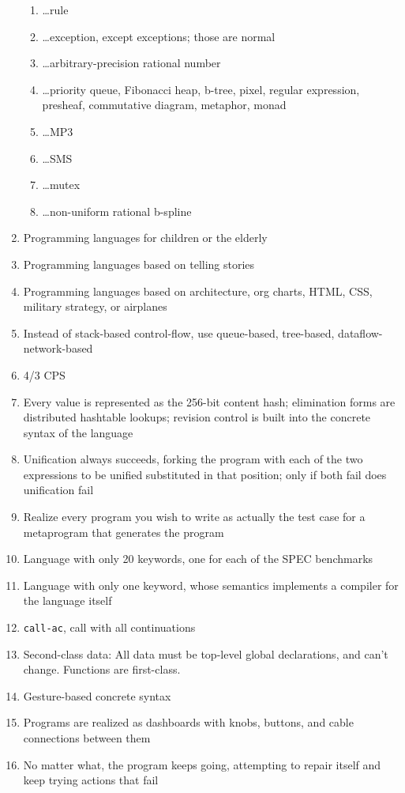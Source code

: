 \documentclass[acmtocl]%
{boviktrans}
\begin{document}
\begin{enumerate}
\begin{enumerate}
     \item \ldots rule
     \item \ldots exception, except exceptions; those are normal
     \item \ldots arbitrary-precision rational number
     \item \ldots priority queue, Fibonacci heap, b-tree, pixel, regular expression, presheaf, commutative diagram, metaphor, monad
     \item \ldots MP3
     \item \ldots SMS
     \item \ldots mutex
     \item \ldots non-uniform rational b-spline
   \end{enumerate}
\item Programming languages for children or the elderly
\item Programming languages based on telling stories
\item Programming languages based on architecture, org charts, HTML, CSS, military strategy, or airplanes
\item Instead of stack-based control-flow, use queue-based, tree-based, dataflow-network-based
\item 4/3 CPS
\item Every value is represented as the 256-bit content hash; elimination forms are distributed hashtable lookups; revision control is built into the concrete syntax of the language
\item Unification always succeeds, forking the program with each of the two expressions to be unified substituted in that position; only if both fail does unification fail
\item Realize every program you wish to write as actually the test case for a metaprogram that generates the program
\item Language with only 20 keywords, one for each of the SPEC benchmarks
\item Language with only one keyword, whose semantics implements a compiler for the language itself
\item {\tt call-ac}, call with all continuations
\item Second-class data: All data must be top-level global declarations, and can't change. Functions are first-class.
\item Gesture-based concrete syntax
\item Programs are realized as dashboards with knobs, buttons, and cable connections between them
\item No matter what, the program keeps going, attempting to repair itself and keep trying actions that fail

\end{enumerate}
\end{document}
